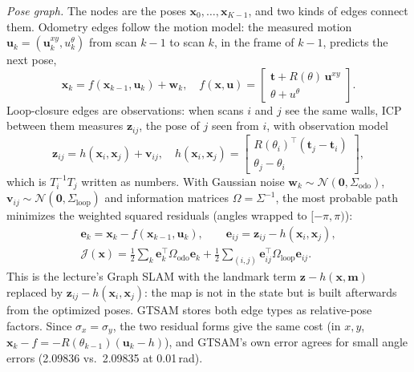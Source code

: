 \documentclass[letterpaper, 10pt, conference]{ieeeconf}
\newcommand{\tb}{\mathbf{t}}
\newcommand{\x}{\mathbf{x}}
\begin{document}
\emph{Pose graph.} The nodes are the poses $\x_0,\dots,\x_{K-1}$, and
two kinds of edges connect them. Odometry edges follow the motion model:
the measured motion $\mathbf{u}_k=(\mathbf{u}^{xy}_k,u^\theta_k)$ from scan
$k-1$ to scan $k$, in the frame of $k-1$, predicts the next pose,
\begin{equation}
\x_k=f(\x_{k-1},\mathbf{u}_k)+\mathbf{w}_k,\quad
f(\x,\mathbf{u})=\begin{bmatrix}\tb+R(\theta)\,\mathbf{u}^{xy}\\ \theta+u^{\theta}\end{bmatrix}.
\label{eq:pgmotion}
\end{equation}
Loop-closure edges are observations: when scans $i$ and $j$ see the same
walls, ICP between them measures $\mathbf{z}_{ij}$, the pose of $j$ seen
from $i$, with observation model
\begin{equation}
\mathbf{z}_{ij}=h(\x_i,\x_j)+\mathbf{v}_{ij},\quad
h(\x_i,\x_j)=\begin{bmatrix}R(\theta_i)^\top(\tb_j-\tb_i)\\ \theta_j-\theta_i\end{bmatrix},
\label{eq:pgobs}
\end{equation}
which is $T_i^{-1}T_j$ written as numbers. With Gaussian noise
$\mathbf{w}_k\sim\mathcal{N}(\mathbf{0},\Sigma_{\text{odo}})$,
$\mathbf{v}_{ij}\sim\mathcal{N}(\mathbf{0},\Sigma_{\text{loop}})$ and
information matrices $\Omega=\Sigma^{-1}$, the most probable path minimizes
the weighted squared residuals (angles wrapped to $[-\pi,\pi)$):
\begin{equation}
\begin{gathered}
\mathbf{e}_k=\x_k-f(\x_{k-1},\mathbf{u}_k),\qquad
\mathbf{e}_{ij}=\mathbf{z}_{ij}-h(\x_i,\x_j),\\
\mathcal{J}(\x)=\tfrac12\sum_k\mathbf{e}_k^\top\Omega_{\text{odo}}\mathbf{e}_k
+\tfrac12\sum_{(i,j)}\mathbf{e}_{ij}^\top\Omega_{\text{loop}}\mathbf{e}_{ij}.
\end{gathered}
\label{eq:posegraph}
\end{equation}
This is the lecture's Graph SLAM with the landmark term
$\mathbf{z}-h(\x,\mathbf{m})$ replaced by $\mathbf{z}_{ij}-h(\x_i,\x_j)$: the
map is not in the state but is built afterwards from the optimized poses.
GTSAM stores both edge types as relative-pose factors. Since
$\sigma_x=\sigma_y$, the two residual forms give the same cost (in $x,y$,
$\x_k-f=-R(\theta_{k-1})(\mathbf{u}_k-h)$), and GTSAM's own error agrees for
small angle errors (2.09836 vs.\ 2.09835 at 0.01\,rad).
\end{document}
